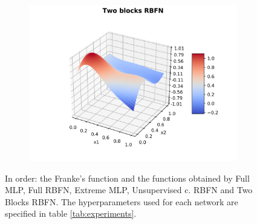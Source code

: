 \documentclass[a4paper]{article}
\numberwithin{equation}{section} %
\numberwithin{figure}{section} %
\numberwithin{table}{section} %
\theoremstyle{definition}
\begin{document}
\begin{figure}[H]
\begin{subfigure}{.32\textwidth}
	\end{subfigure}
  \begin{subfigure}{.32\textwidth}
    \centering
    \includegraphics[width=1.0\linewidth]{images/RBFN_BLOCK_N_70_sigma_05_rho_1e-05.png}
  \end{subfigure}
	\caption{In order: the Franke's function and the functions obtained by
		Full MLP, Full RBFN, Extreme MLP, Unsupervised c. RBFN and Two Blocks RBFN.
		The hyperparameters used for each network are specified in table
		\ref{tab:experiments}.}
	\label{fig:plots}
\end{figure}


%
%

\end{document}
